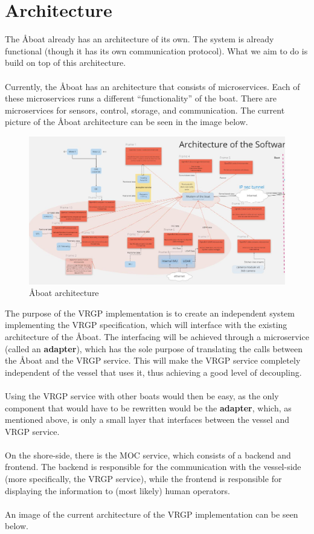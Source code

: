 \section{Architecture}\label{sec:architecture}

The Åboat already has an architecture of its own. The system is already functional (though it has its own communication protocol). What we aim to do is build on top of this architecture.
\\\\
Currently, the Åboat has an architecture that consists of microservices. Each of these microservices runs a different “functionality” of the boat. There are microservices for sensors, control, storage, and communication. The current picture of the Åboat architecture can be seen in the image below.

\begin{figure}[ht]
	\centering
	\includegraphics[width=\linewidth]{images/aboat-architecture}
	\caption{Åboat architecture}
	\label{fig:aboat-architecture}
\end{figure}

The purpose of the VRGP implementation is to create an independent system implementing the VRGP specification, which will interface with the existing architecture of the Åboat. The interfacing will be achieved through a microservice (called an \textbf{adapter}), which has the sole purpose of translating the calls between the Åboat and the VRGP service. This will make the VRGP service completely independent of the vessel that uses it, thus achieving a good level of decoupling.
\\\\
Using the VRGP service with other boats would then be easy, as the only component that would have to be rewritten would be the \textbf{adapter}, which, as mentioned above, is only a small layer that interfaces between the vessel and VRGP service.
\\\\
On the shore-side, there is the MOC service, which consists of a backend and frontend. The backend is responsible for the communication with the vessel-side (more specifically, the VRGP service), while the frontend is responsible for displaying the information to (most likely) human operators.
\\\\
An image of the current architecture of the VRGP implementation can be seen below.

